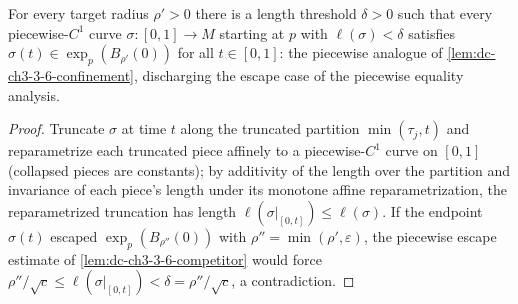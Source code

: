 \begin{lemma}
  \label{lem:dc-ch3-3-6-confinement-piecewise}


  For every target radius $\rho'>0$ there is a length threshold $\delta>0$
  such that every piecewise-$C^1$ curve $\sigma:[0,1]\to M$ starting at $p$
  with $\ell(\sigma)<\delta$ satisfies $\sigma(t)\in\exp_p(B_{\rho'}(0))$
  for all $t\in[0,1]$: the piecewise analogue of
  \cref{lem:dc-ch3-3-6-confinement}, discharging the escape case of the
  piecewise equality analysis.
\end{lemma}
\begin{proof}
  \sketch

  Truncate $\sigma$ at time $t$ along the truncated partition
  $\min(\tau_j,t)$ and reparametrize each truncated piece affinely to a
  piecewise-$C^1$ curve on $[0,1]$ (collapsed pieces are constants); by
  additivity of the length over the partition and invariance of each
  piece's length under its monotone affine reparametrization, the
  reparametrized truncation has length
  $\ell(\sigma|_{[0,t]})\le\ell(\sigma)$. If the endpoint $\sigma(t)$
  escaped $\exp_p(B_{\rho''}(0))$ with $\rho''=\min(\rho',\varepsilon)$, the
  piecewise escape estimate of \cref{lem:dc-ch3-3-6-competitor} would force
  $\rho''/\sqrt{c}\le\ell(\sigma|_{[0,t]})<\delta=\rho''/\sqrt{c}$, a
  contradiction.
\end{proof}

